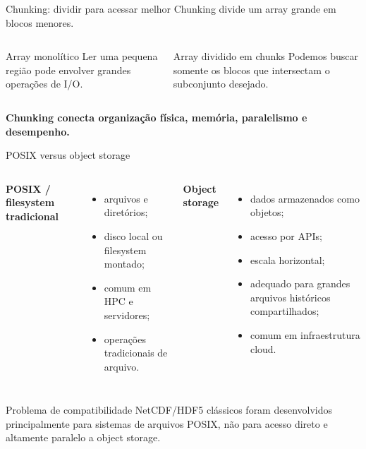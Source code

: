 \documentclass[aspectratio=169]{beamer}
\begin{document}
\begin{frame}{Chunking: dividir para acessar melhor}
\Large
Chunking divide um array grande em blocos menores.

\vspace{0.4cm}

\begin{columns}
\begin{block}{Array monolítico}
Ler uma pequena região pode envolver grandes operações de I/O.
\end{block}

\begin{block}{Array dividido em chunks}
Podemos buscar somente os blocos que intersectam o subconjunto desejado.
\end{block}
\end{columns}

\vspace{0.5cm}

\centering
\textbf{Chunking conecta organização física, memória, paralelismo e desempenho.}
\end{frame}

\begin{frame}{POSIX versus object storage}
\begin{columns}
\textbf{POSIX / filesystem tradicional}

\begin{itemize}
  \item arquivos e diretórios;
  \item disco local ou filesystem montado;
  \item comum em HPC e servidores;
  \item operações tradicionais de arquivo.
\end{itemize}

\textbf{Object storage}

\begin{itemize}
  \item dados armazenados como objetos;
  \item acesso por APIs;
  \item escala horizontal;
  \item adequado para grandes arquivos históricos compartilhados;
  \item comum em infraestrutura cloud.
\end{itemize}
\end{columns}

\vspace{0.3cm}

\begin{block}{Problema de compatibilidade}
NetCDF/HDF5 clássicos foram desenvolvidos principalmente para sistemas de arquivos POSIX, não para acesso direto e altamente paralelo a object storage.
\end{block}
\end{frame}
\end{document}

